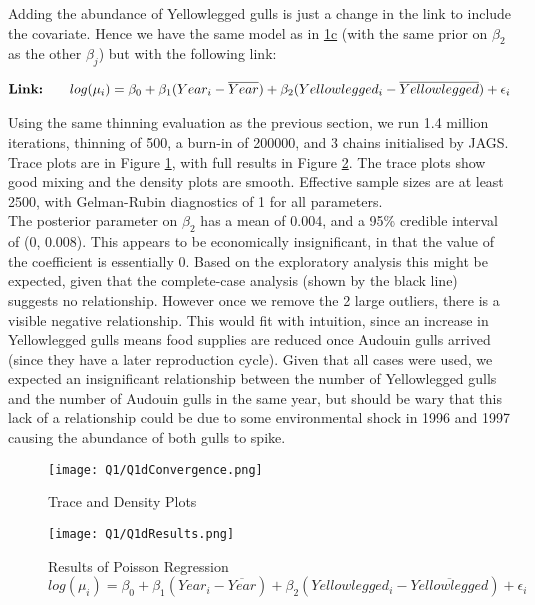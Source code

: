 \documentclass[11pt]{article}
\begin{document}
Adding the abundance of Yellowlegged gulls is just a change in the link to include the covariate. Hence we have the same model as in \hyperref[sec::1c]{1c} (with the same prior on $\beta_2$ as the other $\beta_j$) but with the following link:

\begin{align*}
\text{\textbf{Link:}} \quad        &&log(\mu_i)                 = \beta_0 + \beta_1(Year_i - \overline{Year}) + \beta_2(Yellowlegged_i - \overline{Yellowlegged}) + \epsilon_i\\
\end{align*}

\vspace{-3mm}

Using the same thinning evaluation as the previous section, we run 1.4 million iterations, thinning of 500, a burn-in of 200000, and 3 chains initialised by JAGS. Trace plots are in Figure \ref{Fig::1dTrace}, with full results in Figure \ref{Fig::1dRes}. The trace plots show good mixing and the density plots are smooth. Effective sample sizes are at least 2500, with Gelman-Rubin diagnostics of 1 for all parameters. \\
The posterior parameter on $\beta_2$ has a mean of 0.004, and a 95\% credible interval of (0, 0.008). This appears to be economically insignificant, in that the value of the coefficient is essentially 0. Based on the exploratory analysis this might be expected, given that the complete-case analysis (shown by the black line) suggests no relationship. However once we remove the 2 large outliers, there is a visible negative relationship. This would fit with intuition, since an increase in Yellowlegged gulls means food supplies are reduced once Audouin gulls arrived (since they have a later reproduction cycle). Given that all cases were used, we expected an insignificant relationship between the number of Yellowlegged gulls and the number of Audouin gulls in the same year, but should be wary that this lack of a relationship could be due to some environmental shock in 1996 and 1997 causing the abundance of both gulls to spike.  

\begin{figure}[!h]
\centering
\texttt{[image: Q1/Q1dConvergence.png]}
\caption{Trace and Density Plots} \label{Fig::1dTrace}
\end{figure}

\vspace{-3mm}

\begin{figure}[!h]
\centering
\texttt{[image: Q1/Q1dResults.png]}
\caption{Results of Poisson Regression $log(\mu_i) = \beta_0 + \beta_1(Year_i - \overline{Year}) + \beta_2(Yellowlegged_i - \overline{Yellowlegged}) +  \epsilon_i$} \label{Fig::1dRes}
\end{figure}
\end{document}
